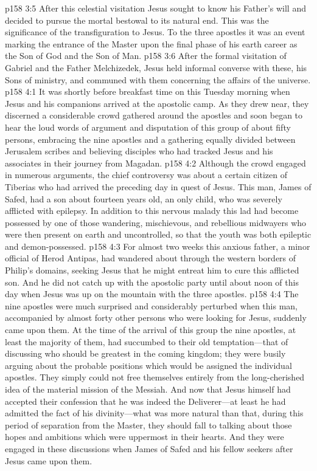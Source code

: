 \vs p158 3:5 After this celestial visitation Jesus sought to know his Father’s will and decided to pursue the mortal bestowal to its natural end. This was the significance of the transfiguration to Jesus. To the three apostles it was an event marking the entrance of the Master upon the final phase of his earth career as the Son of God and the Son of Man.
\vs p158 3:6 After the formal visitation of Gabriel and the Father Melchizedek, Jesus held informal converse with these, his Sons of ministry, and communed with them concerning the affairs of the universe.
\vs p158 4:1 It was shortly before breakfast time on this Tuesday morning when Jesus and his companions arrived at the apostolic camp. As they drew near, they discerned a considerable crowd gathered around the apostles and soon began to hear the loud words of argument and disputation of this group of about fifty persons, embracing the nine apostles and a gathering equally divided between Jerusalem scribes and believing disciples who had tracked Jesus and his associates in their journey from Magadan.
\vs p158 4:2 Although the crowd engaged in numerous arguments, the chief controversy was about a certain citizen of Tiberias who had arrived the preceding day in quest of Jesus. This man, James of Safed, had a son about fourteen years old, an only child, who was severely afflicted with epilepsy. In addition to this nervous malady this lad had become possessed by one of those wandering, mischievous, and rebellious midwayers who were then present on earth and uncontrolled, so that the youth was both epileptic and demon\hyp{}possessed.
\vs p158 4:3 For almost two weeks this anxious father, a minor official of Herod Antipas, had wandered about through the western borders of Philip’s domains, seeking Jesus that he might entreat him to cure this afflicted son. And he did not catch up with the apostolic party until about noon of this day when Jesus was up on the mountain with the three apostles.
\vs p158 4:4 The nine apostles were much surprised and considerably perturbed when this man, accompanied by almost forty other persons who were looking for Jesus, suddenly came upon them. At the time of the arrival of this group the nine apostles, at least the majority of them, had succumbed to their old temptation---that of discussing who should be greatest in the coming kingdom; they were busily arguing about the probable positions which would be assigned the individual apostles. They simply could not free themselves entirely from the long\hyp{}cherished idea of the material mission of the Messiah. And now that Jesus himself had accepted their confession that he was indeed the Deliverer---at least he had admitted the fact of his divinity---what was more natural than that, during this period of separation from the Master, they should fall to talking about those hopes and ambitions which were uppermost in their hearts. And they were engaged in these discussions when James of Safed and his fellow seekers after Jesus came upon them.
